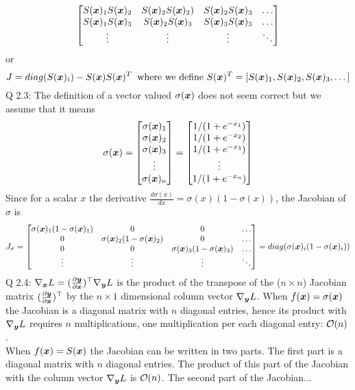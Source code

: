 {$$\begin{bmatrix}
    S({\bm{x}})_1S({\bm{x}})_2 & S({\bm{x}})_2S({\bm{x}})_2) &  S({\bm{x}})_2S({\bm{x}})_3& \dots  \\
    S({\bm{x}})_1S({\bm{x}})_3 & S({\bm{x}})_2S({\bm{x}})_3 & S({\bm{x}})_3S({\bm{x}})_3 & \dots  \\ 
    \vdots & \vdots & \vdots & \ddots 
\end{bmatrix}
$$
or 
$$
J=diag(S({\bm{x}})_i)-S({\bm{x}})S({\bm{x}})^T\;\;\text{where we define $S({\bm{x}})^T=[S({\bm{x}})_1,S({\bm{x}})_2,S({\bm{x}})_3,\dots]$}
$$
Q 2.3: The definition of a vector valued $\sigma({\bm{x}})$ does not seem correct but we assume that it means
$$\sigma({\bm{x}})=\begin{bmatrix}
    \sigma({\bm{x}})_1 \\
    \sigma({\bm{x}})_2\\
    \sigma({\bm{x}})_3\\ 
    \vdots  \\
     \sigma({\bm{x}})_n
\end{bmatrix}
=\begin{bmatrix}
    1/(1 + e^{-x_1})\\
    1/(1 + e^{-x_2})\\
    1/(1 + e^{-x_3})\\ 
    \vdots  \\
     1/(1 + e^{-x_n})
\end{bmatrix}$$
Since for a scalar $x$ the derivative   $\frac{d\sigma(x)}{dx}=\sigma(x)(1-\sigma(x))$, the Jacobian of $\sigma$ is
$$
J_\sigma=\begin{bmatrix}
    \sigma({\bm{x}})_1 (1-\sigma({\bm{x}})_1)& 0 & 0 & \dots  \\
    0 & \sigma({\bm{x}})_2 (1-\sigma({\bm{x}})_2)&  0& \dots  \\
    0 & 0 & \sigma({\bm{x}})_3 (1-\sigma({\bm{x}})_3)& \dots  \\ 
    \vdots & \vdots & \vdots & \ddots 
\end{bmatrix}=diag(\sigma({\bm{x}})_i (1-\sigma({\bm{x}})_i))
$$
Q 2.4: $ \nabla_{\bm{x}} L = (\frac{\partial {\bm{y}}}{\partial {\bm{x}}})^\top  \nabla_{\bm{y}} L$ is the product of the transpose of the ($n\times n$) Jacobian matrix $(\frac{\partial {\bm{y}}}{\partial {\bm{x}}})^\top$ by the $n\times 1$ dimensional column vector $\nabla_{\bm{y}} L$. When $f({\bm{x}})=\sigma({\bm{x}})$ the Jacobian is a diagonal matrix with $n$ diagonal entries, hence its product with $\nabla_{\bm{y}} L$ requires $n$ multiplications, one multiplication per each diagonal entry: ${\mathcal{O}}(n)$. \\
When $f({\bm{x}})=S({\bm{x}})$ the Jacobian can be written in two parts. The first part is a diagonal matrix with $n$ diagonal entries. The product of this part of the Jacobian with the column vector $\nabla_{\bm{y}} L$ is ${\mathcal{O}}(n)$. The second part of the Jacobian...  
}